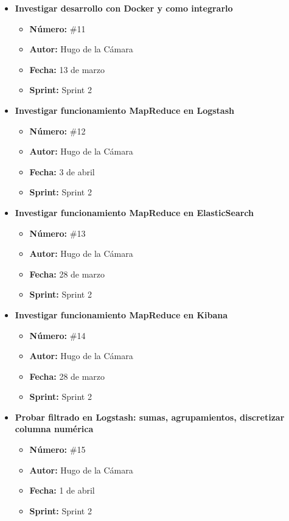\begin{itemize}
    \item \textbf{Investigar desarrollo con Docker y como integrarlo}
    \begin{itemize}
        \item \textbf{Número:} \#11
        \item \textbf{Autor:} Hugo de la Cámara
        \item \textbf{Fecha:} 13 de marzo
        \item \textbf{Sprint:} Sprint 2
    \end{itemize}
    
    \item \textbf{Investigar funcionamiento MapReduce en Logstash}
    \begin{itemize}
        \item \textbf{Número:} \#12
        \item \textbf{Autor:} Hugo de la Cámara
        \item \textbf{Fecha:} 3 de abril
        \item \textbf{Sprint:} Sprint 2
    \end{itemize}
    
    \item \textbf{Investigar funcionamiento MapReduce en ElasticSearch}
    \begin{itemize}
        \item \textbf{Número:} \#13
        \item \textbf{Autor:} Hugo de la Cámara
        \item \textbf{Fecha:} 28 de marzo
        \item \textbf{Sprint:} Sprint 2
    \end{itemize}
    
    \item \textbf{Investigar funcionamiento MapReduce en Kibana}
    \begin{itemize}
        \item \textbf{Número:} \#14
        \item \textbf{Autor:} Hugo de la Cámara
        \item \textbf{Fecha:} 28 de marzo
        \item \textbf{Sprint:} Sprint 2
    \end{itemize}
    
    \item \textbf{Probar filtrado en Logstash: sumas, agrupamientos, discretizar columna numérica}
    \begin{itemize}
        \item \textbf{Número:} \#15
        \item \textbf{Autor:} Hugo de la Cámara
        \item \textbf{Fecha:} 1 de abril
        \item \textbf{Sprint:} Sprint 2
    \end{itemize}
    

\end{itemize}
